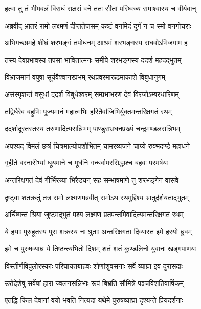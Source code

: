 
\twolineshloka
{हत्वा तु तं भीमबलं विराधं राक्षसं वने}
{ततः सीतां परिष्वज्य समाश्वास्य च वीर्यवान्} %

\twolineshloka
{अब्रवीद् भ्रातरं रामो लक्ष्मणं दीप्ततेजसम्}
{कष्टं वनमिदं दुर्गं न च स्मो वनगोचराः} %

\twolineshloka
{अभिगच्छामहे शीघ्रं शरभङ्गं तपोधनम्}
{आश्रमं शरभङ्गस्य राघवोऽभिजगाम ह} %

\twolineshloka
{तस्य देवप्रभावस्य तपसा भावितात्मनः}
{समीपे शरभङ्गस्य ददर्श महदद्भुतम्} %

\twolineshloka
{विभ्राजमानं वपुषा सूर्यवैश्वानरप्रभम्}
{रथप्रवरमारूढमाकाशे विबुधानुगम्} %

\twolineshloka
{असंस्पृशन्तं वसुधां ददर्श विबुधेश्वरम्}
{सम्प्रभाभरणं देवं विरजोऽम्बरधारिणम्} %

\twolineshloka
{तद्विधैरेव बहुभिः पूज्यमानं महात्मभिः}
{हरितैर्वाजिभिर्युक्तमन्तरिक्षगतं रथम्} %

\twolineshloka
{ददर्शादूरतस्तस्य तरुणादित्यसन्निभम्}
{पाण्डुराभ्रघनप्रख्यं चन्द्रमण्डलसन्निभम्} %

\twolineshloka
{अपश्यद् विमलं छत्रं चित्रमाल्योपशोभितम्}
{चामरव्यजने चाग्र्ये रुक्मदण्डे महाधने} %

\twolineshloka
{गृहीते वरनारीभ्यां धूयमाने च मूर्धनि}
{गन्धर्वामरसिद्धाश्च बहवः परमर्षयः} %

\twolineshloka
{अन्तरिक्षगतं देवं गीर्भिरग्र्या भिरैडयन्}
{सह सम्भाषमाणे तु शरभङ्गेन वासवे} %

\twolineshloka
{दृष्ट्वा शतक्रतुं तत्र रामो लक्ष्मणमब्रवीत्}
{रामोऽथ रथमुद्दिश्य भ्रातुर्दर्शयताद्भुतम्} %

\twolineshloka
{अर्चिष्मन्तं श्रिया जुष्टमद्भुतं पश्य लक्ष्मण}
{प्रतपन्तमिवादित्यमन्तरिक्षगतं रथम्} %

\twolineshloka
{ये हयाः पुरुहूतस्य पुरा शक्रस्य नः श्रुताः}
{अन्तरिक्षगता दिव्यास्त इमे हरयो ध्रुवम्} %

\twolineshloka
{इमे च पुरुषव्याघ्र ये तिष्ठन्त्यभितो दिशम्}
{शतं शतं कुण्डलिनो युवानः खड्गपाणयः} %

\twolineshloka
{विस्तीर्णविपुलोरस्काः परिघायतबाहवः}
{शोणांशुवसनाः सर्वे व्याघ्रा इव दुरासदाः} %

\twolineshloka
{उरोदेशेषु सर्वेषां हारा ज्वलनसन्निभाः}
{रूपं बिभ्रति सौमित्रे पञ्चविंशतिवार्षिकम्} %

\twolineshloka
{एतद्धि किल देवानां वयो भवति नित्यदा}
{यथेमे पुरुषव्याघ्रा दृश्यन्ते प्रियदर्शनाः} %


